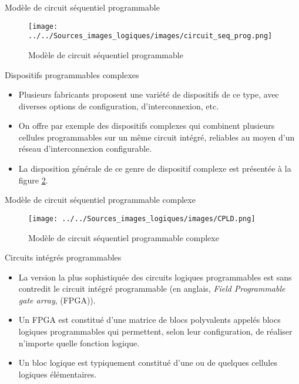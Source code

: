\documentclass[presentation]{beamer}
\begin{document}
\begin{frame}[label={sec:orgd709b0e}]{Modèle de circuit séquentiel programmable}
\begin{figure}[htbp]
\centering
\texttt{[image: ../../Sources\_images\_logiques/images/circuit\_seq\_prog.png]}
\caption{\label{fig:org7be87bf}Modèle de circuit séquentiel programmable}
\end{figure} 
\end{frame}

\begin{frame}[label={sec:org167b53c}]{Dispositifs programmables complexes}
\begin{itemize}
\item Plusieurs fabricants proposent une variété de dispositifs de ce type, avec diverses options de configuration, d'interconnexion, etc.

\item On offre par exemple des dispositifs complexes qui combinent plusieurs cellules programmables sur un même circuit intégré, reliables au moyen d'un réseau d'interconnexion configurable.

\item La disposition générale de ce genre de dispositif complexe est présentée à la figure \ref{fig:org7272ed0}.
\end{itemize}
\end{frame}

\begin{frame}[label={sec:orgc056e63}]{Modèle de circuit séquentiel programmable complexe}
\begin{figure}[htbp]
\centering
\texttt{[image: ../../Sources\_images\_logiques/images/CPLD.png]}
\caption{\label{fig:org7272ed0}Modèle de circuit séquentiel programmable complexe}
\end{figure}
\end{frame}

\begin{frame}[label={sec:org4dec980}]{Circuits intégrés programmables}
\begin{itemize}
\item La version la plus sophistiquée des circuits logiques programmables est sans contredit le circuit intégré programmable (en anglais, \emph{Field Programmable gate array}, (FPGA)).

\item Un FPGA est constitué d'une matrice de blocs polyvalents appelés \alert{blocs logiques programmables} qui permettent, selon leur configuration, de réaliser n'importe quelle fonction logique.

\item Un bloc logique est typiquement constitué d'une ou de quelques \alert{cellules logiques} élémentaires.
\end{itemize}
\end{frame}
\end{document}
